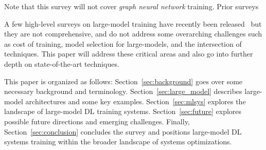 Note that this survey will not cover \textit{graph neural network} training. Prior surveys~\cite{}

A few high-level surveys on large-model training have recently been released~\cite{surveylarge2022,lowmemory2019} but they are not comprehensive, and do not address some overarching challenges such as cost of training, model selection for large-models, and the intersection of techniques. This paper will address these critical areas and also go into further depth on state-of-the-art techniques.

This paper is organized as follows: Section~\ref{sec:background} goes over some necessary background and terminology. Section~\ref{sec:large_model} describes large-model architectures and some key examples. Section~\ref{sec:mlsys} explores the landscape of large-model DL training systems. Section~\ref{sec:future} explores possible future directions and emerging challenges. Finally, Section~\ref{sec:conclusion} concludes the survey and positions large-model DL systems training within the broader landscape of systems optimizations.




